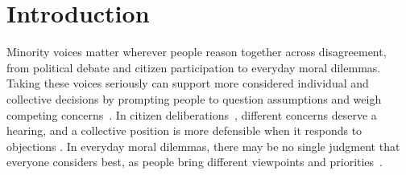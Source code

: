 \section{Introduction}
\label{sec:intro}


Minority voices matter wherever people reason together across
disagreement, from political debate and citizen participation to
everyday moral dilemmas. Taking these voices seriously can support
more considered individual and collective decisions by prompting
people to question assumptions and weigh competing
concerns~\cite{nemeth1986differential}. 
In citizen deliberations~\cite{fishkin1991democracy}, different concerns deserve a hearing, and a collective position is more defensible when it responds to objections \cite{gutmann2004deliberative}. 
In everyday moral dilemmas, there may be no single judgment that everyone considers best, as people bring different viewpoints and priorities~\cite{shi2025moral}.


